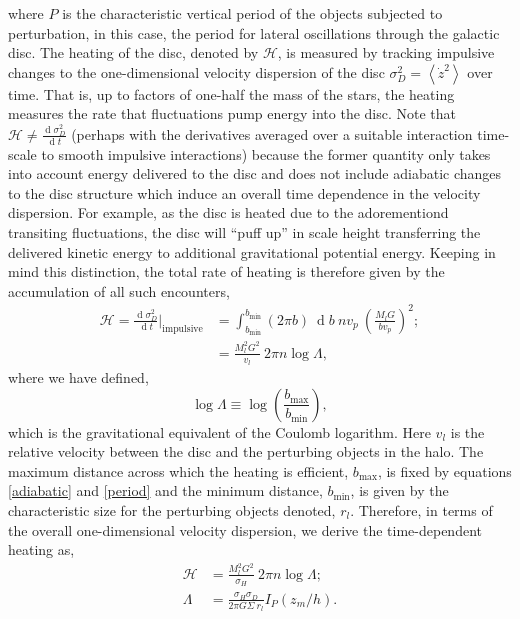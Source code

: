 \documentclass[usenatbib]{mnras}
\renewcommand{\d}[1]{\! \mathrm{d}#1 \:}
\newcommand{\deriv}[2]{\frac{\d{#1}}{\d{#2}}}
\renewcommand{\d}[1]{\ensuremath{\operatorname{d}\!{#1}}}
\begin{document}
{ \color{red}
where $P$ is the characteristic vertical period of the objects subjected to perturbation, in this case, the period for lateral oscillations through the galactic disc. The heating of the disc, denoted by $\mathcal{H}$, is measured by tracking impulsive changes to the one-dimensional velocity dispersion of the disc $\sigma_D^2 = \left< \dot{z}^2 \right>$ over time. That is, up to factors of one-half the mass of the stars, the heating measures the rate that fluctuations pump energy into the disc. Note that $\mathcal{H} \neq \deriv{\sigma_D^2}{t}$ (perhaps with the derivatives averaged over a suitable interaction time-scale to smooth impulsive interactions) because the former quantity only takes into account energy delivered to the disc and does not include adiabatic changes to the disc structure which induce an overall time dependence in the velocity dispersion. For example, as the disc is heated due to the adorementiond transiting fluctuations, the disc will ``puff up'' in scale height transferring the delivered kinetic energy to additional gravitational potential energy. Keeping in mind this distinction, the total rate of heating is therefore given by the accumulation of all such encounters,
\begin{subequations}
\begin{align}
\mathcal{H} = \deriv{\sigma_D^2}{t} \bigg|_{\text{impulsive}} &= \int_{b_{\min}}^{b_{\min}} (2 \pi b) \: \d{b} \: n v_p \: \left( \frac{M_l G}{b v_p} \right)^2 ;
\\
& = \frac{M_l^2 G^2}{v_l} \: 2 \pi n \log{\Lambda},
\end{align}
\end{subequations}
where we have defined,
\begin{equation}
\log{\Lambda} \equiv \log{\left( \frac{b_{\text{max}}}{b_{\text{min}}} \right)},
\end{equation}
which is the gravitational equivalent of the Coulomb logarithm. Here $v_l$ is the relative velocity between the disc and the perturbing objects in the halo. 
The maximum distance across which the heating is efficient, $b_{\max}$, is fixed by equations \eqref{adiabatic} and \eqref{period} and the minimum distance, $b_{\min}$, is given by the characteristic size for the perturbing objects denoted, $r_{l}$. 
Therefore, in terms of the overall one-dimensional velocity dispersion, we derive the time-dependent heating as,
\begin{subequations}
\begin{align}
\mathcal{H} &= \frac{M_l^2 G^2}{\sigma_H} \: 2 \pi n \log{\Lambda} ;
\\
\Lambda & = \frac{\sigma_H \sigma_D}{2 \pi G \Sigma \: r_l} I_P(z_m / h).
\end{align}
\end{subequations}
}
\end{document}
